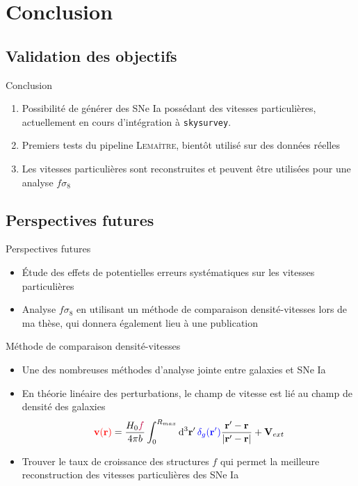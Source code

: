 \documentclass{beamer}
\def\lemaitre{\textsc{Lemaître}\xspace}
\def\skysurvey{\texttt{skysurvey}\xspace}
\begin{document}
\section{Conclusion}

\subsection{Validation des objectifs}

\begin{frame}{Conclusion}
\begin{enumerate}
\item Possibilité de générer des SNe Ia possédant des vitesses particulières, actuellement en cours d'intégration à \skysurvey.
\item Premiers tests du pipeline \lemaitre, bientôt utilisé sur des données réelles
\item Les vitesses particulières sont reconstruites et peuvent être utilisées pour une analyse $f\sigma_8$
\end{enumerate}
\end{frame}

\subsection{Perspectives futures}
\begin{frame}{Perspectives futures}
\begin{itemize}
\item Étude des effets de potentielles erreurs systématiques sur les vitesses particulières
\item Analyse $f\sigma_8$ en utilisant un méthode de comparaison densité-vitesses lors de ma thèse, qui donnera également lieu à une publication
\end{itemize}
\end{frame}

\begin{frame}{Méthode de comparaison densité-vitesses}
\begin{itemize}
\item<+-> Une des nombreuses méthodes d'analyse jointe entre galaxies et SNe Ia
\item<+-> En théorie linéaire des perturbations, le champ de vitesse est lié au champ de densité des galaxies
\begin{equation}
	\textcolor{red}{\vb v (\vb r)} = \frac{H_0 \textcolor{purple}{f}}{4 \pi b} \int_0^{R_{max}} \dd[3]{\vb r'} \textcolor{blue}{\delta_g(\vb r')} \frac{\vb r' - \vb r}{\abs{\vb r' - \vb r}} + \vb V_{ext}
\end{equation}
\item<+-> Trouver le taux de croissance des structures $f$ qui permet la meilleure reconstruction des vitesses particulières des SNe Ia
\end{itemize}
\end{frame}
\end{document}
